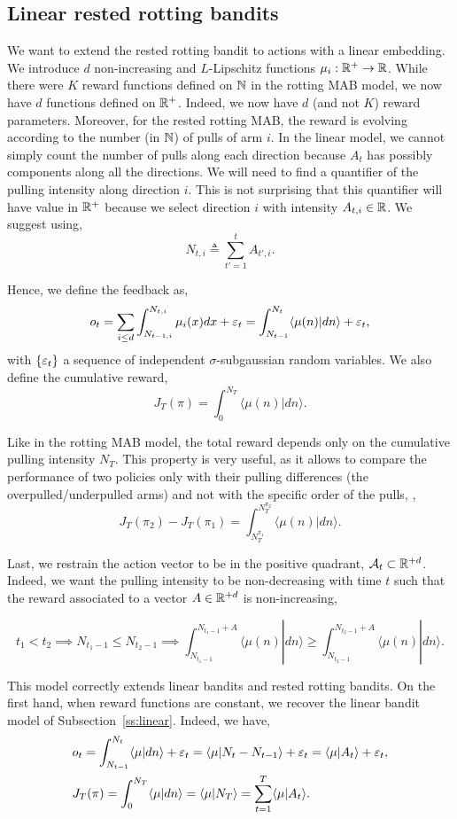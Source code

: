\subsection{Linear rested rotting bandits}
We want to extend the rested rotting bandit to actions with a linear embedding. We introduce $d$ non-increasing and $L$-Lipschitz functions $\mu_i : \mathbb{R}^+ \rightarrow \mathbb{R}$. While there were $K$ reward functions defined on ${\mathbb N}$ in the rotting MAB model, we now have $d$ functions defined on $\mathbb{R}^+$. Indeed, we now have $d$ (and not $K$) reward parameters. Moreover, for the rested rotting MAB, the reward is evolving according to the number (in ${\mathbb N}$) of pulls of arm $i$. In the linear model, we cannot simply count the number of pulls along each direction because $A_t$ has possibly components along all the directions. We will need to find a quantifier of the pulling intensity along direction $i$. This is not surprising that this quantifier will have value in $\mathbb{R}^+$ because we select direction $i$ with intensity $A_{t,i} \in \mathbb{R}$. We suggest using, 
\[
N_{t,i} \triangleq \sum_{t'=1}^t A_{t',i}.
\]

Hence, we define the feedback as, 
\[
o_t = \sum_{i\leq d} \int_{N_{t-1,i}}^{N_{t,i}} \mu_i(x)dx +\varepsilon_t  = \int_{N_{t-1}}^{N_{t}} \langle \mu(n) |   dn \rangle  + \varepsilon_t,
\]
with $\{\varepsilon_t\}$ a sequence of independent $\sigma$-subgaussian random variables. We also define the cumulative reward, 
\[
 J_T(\pi) = \int_{0}^{N_{T}} \langle \mu(n) |  dn \rangle.
 \]

Like in the rotting MAB model, the total reward depends only on the cumulative pulling intensity $N_{T}$. This property is very useful, as it allows to compare the performance of two policies only with their pulling differences (the overpulled/underpulled arms) and not with the specific order of the pulls, \ie, 
\[
 J_T(\pi_2) - J_T(\pi_1) = \int_{N_T^{\pi_1}}^{N_{T}^{\pi_2}} \langle \mu(n) |  dn \rangle.
\]

Last, we restrain the action vector to be in the positive quadrant, \ie $\mathcal{A}_t \subset \mathbb{R}^{+d}$. Indeed, we want the pulling intensity to be non-decreasing with time $t$ such that the reward associated to a vector $A\in \mathbb{R}^{+d} $ is non-increasing, 

\[
t_1 < t_2 \implies  N_{t_1-1} \leq N_{t_2-1}  \implies \int_{N_{t_1-1}}^{N_{t_1-1} + A} \langle \mu(n) |   dn \rangle \geq \int_{N_{t_2-1}}^{N_{t_2-1} + A} \langle \mu(n) |   dn \rangle.
\]

This model correctly extends linear bandits and rested rotting bandits. On the first hand, when reward functions are constant, we recover the linear bandit model of Subsection~\ref{ss:linear}. Indeed, we have,
\begin{align*}
&o_t =  \int_{N_{t-1}}^{N_{t}} \langle \mu |   dn \rangle  + \varepsilon_t =  \langle \mu | N_t - N_{t-1} \rangle  + \varepsilon_t = \langle \mu | A_t \rangle  + \varepsilon_t,\\
& J_T(\pi) = \int_{0}^{N_{T}} \langle \mu |  dn \rangle = \langle \mu | N_T\rangle =  \sum_{t=1}^T \langle \mu | A_t \rangle .
\end{align*}


